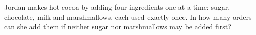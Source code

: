 Jordan makes hot cocoa by adding four ingredients one at a time: sugar, chocolate, milk and marshmallows, each used exactly once. In how many orders can she add them if neither sugar nor marshmallows may be added first?
